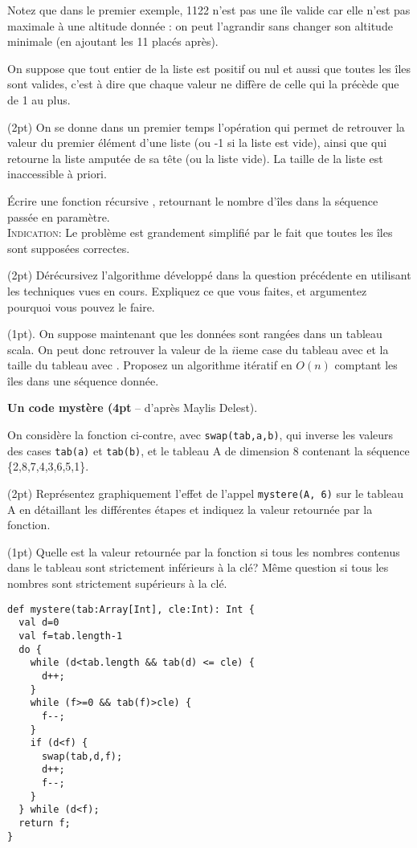 \documentclass[10pt]{article}\usepackage[nu]{esial}
\begin{document}
Notez que dans le premier exemple, 1122 n'est pas une île valide car
elle n'est pas maximale à une altitude donnée : on peut l'agrandir
sans changer son altitude minimale (en ajoutant les 11 placés après).

On suppose que tout entier de la liste est positif ou nul et aussi que toutes
les îles sont valides, c'est à dire que chaque valeur ne diffère de celle qui la
précède que de 1 au plus.

\Question(2pt)
On se donne dans un premier temps l'opération  qui
permet de retrouver la valeur du premier élément d'une liste (ou -1 si la liste
est vide), ainsi que  qui retourne la liste
amputée de sa tête (ou la liste vide). La taille de la liste est inaccessible à
priori.

Écrire une fonction récursive , retournant le
nombre d'îles dans la séquence passée en paramètre.\\
\textsc{Indication:} Le problème est grandement simplifié par le fait que toutes
les îles sont supposées correctes.

\Question(2pt)
Dérécursivez l'algorithme développé dans la question précédente en utilisant les
techniques vues en cours. Expliquez ce que vous faites, et argumentez pourquoi
vous pouvez le faire.

\Question(1pt).  On suppose maintenant que les données sont rangées dans un
tableau scala. On peut donc retrouver la valeur de la $i$ieme case du tableau
 avec  et la taille du tableau avec
.
%
Proposez un algorithme itératif en $O(n)$ comptant les îles dans une séquence
donnée.

\medskip
\Exercice\textbf{Un code mystère {\rm(}4pt} -- d'après Maylis Delest).\smallskip

\noindent\begin{minipage}{.54\linewidth}
On considère la fonction ci-contre, avec
\texttt{swap(tab,a,b)}, qui inverse les valeurs des cases \texttt{tab(a)} et
\texttt{tab(b)}, et le tableau A de dimension 8 contenant la séquence \{2,8,7,4,3,6,5,1\}.

\Question(2pt) Représentez graphiquement l'effet de l'appel \texttt{mystere(A,
  6)} sur le tableau A en détaillant les différentes étapes et indiquez la
valeur retournée par la fonction.

\Question(1pt) Quelle est la valeur retournée par la fonction si tous les
nombres contenus dans le tableau sont strictement inférieurs à la clé? Même
question si tous les nombres sont strictement supérieurs à la clé.
\end{minipage}\hfill\begin{minipage}{.44\linewidth}
\begin{Verbatim}[numbers=right]
def mystere(tab:Array[Int], cle:Int): Int {
  val d=0
  val f=tab.length-1
  do {
    while (d<tab.length && tab(d) <= cle) {
      d++;
    }
    while (f>=0 && tab(f)>cle) {
      f--;
    }
    if (d<f) {
      swap(tab,d,f);
      d++;
      f--;
    }
  } while (d<f);
  return f;
}
\end{Verbatim}
\end{minipage}
\end{document}
